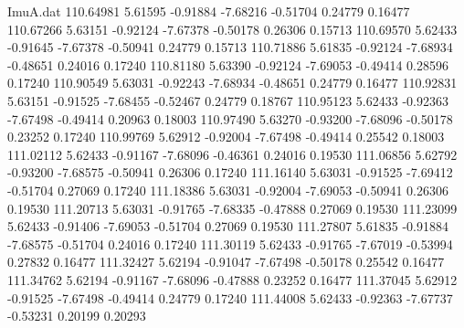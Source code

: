 \begin{filecontents}{ImuA.dat}
 110.64981    5.61595   -0.91884   -7.68216   -0.51704    0.24779    0.16477
 110.67266    5.63151   -0.92124   -7.67378   -0.50178    0.26306    0.15713
 110.69570    5.62433   -0.91645   -7.67378   -0.50941    0.24779    0.15713
 110.71886    5.61835   -0.92124   -7.68934   -0.48651    0.24016    0.17240
 110.81180    5.63390   -0.92124   -7.69053   -0.49414    0.28596    0.17240
 110.90549    5.63031   -0.92243   -7.68934   -0.48651    0.24779    0.16477
 110.92831    5.63151   -0.91525   -7.68455   -0.52467    0.24779    0.18767
 110.95123    5.62433   -0.92363   -7.67498   -0.49414    0.20963    0.18003
 110.97490    5.63270   -0.93200   -7.68096   -0.50178    0.23252    0.17240
 110.99769    5.62912   -0.92004   -7.67498   -0.49414    0.25542    0.18003
 111.02112    5.62433   -0.91167   -7.68096   -0.46361    0.24016    0.19530
 111.06856    5.62792   -0.93200   -7.68575   -0.50941    0.26306    0.17240
 111.16140    5.63031   -0.91525   -7.69412   -0.51704    0.27069    0.17240
 111.18386    5.63031   -0.92004   -7.69053   -0.50941    0.26306    0.19530
 111.20713    5.63031   -0.91765   -7.68335   -0.47888    0.27069    0.19530
 111.23099    5.62433   -0.91406   -7.69053   -0.51704    0.27069    0.19530
 111.27807    5.61835   -0.91884   -7.68575   -0.51704    0.24016    0.17240
 111.30119    5.62433   -0.91765   -7.67019   -0.53994    0.27832    0.16477
 111.32427    5.62194   -0.91047   -7.67498   -0.50178    0.25542    0.16477
 111.34762    5.62194   -0.91167   -7.68096   -0.47888    0.23252    0.16477
 111.37045    5.62912   -0.91525   -7.67498   -0.49414    0.24779    0.17240
 111.44008    5.62433   -0.92363   -7.67737   -0.53231    0.20199    0.20293
\end{filecontents}
